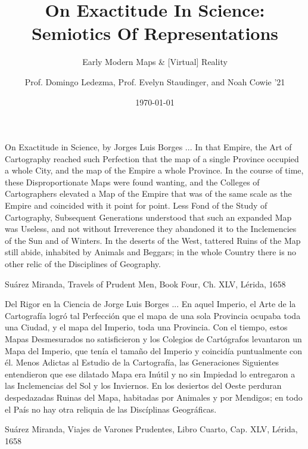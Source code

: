 \documentclass{beamer}
\title{On Exactitude In Science: Semiotics Of Representations}
\subtitle{Early Modern Maps \& [Virtual] Reality}
\author{Prof. Domingo Ledezma, Prof. Evelyn Staudinger, and Noah Cowie '21}
\date{\today}
\begin{document}
\maketitle

\begin{frame}{On Exactitude in Science, by Jorges Luis Borges}
	... In that Empire, the Art of Cartography reached such Perfection that the map of a single
	Province occupied a whole City, and the map of the Empire a whole Province. In the course
	of time, these Disproportionate Maps were found wanting, and the Colleges of Cartographers
	elevated a Map of the Empire that was of the same scale as the Empire and coincided with it
	point for point. Less Fond of the Study of Cartography, Subsequent Generations understood
	that such an expanded Map was Useless, and not without Irreverence they abandoned it to the
	Inclemencies of the Sun and of Winters. In the deserts of the West, tattered Ruins of the Map
	still abide, inhabited by Animals and Beggars; in the whole Country there is no other relic of
	the Disciplines of Geography.\par

	\hfill Su\'arez Miranda, Travels of Prudent Men, Book Four, Ch. XLV, L\'erida, 1658\par
\end{frame}

\begin{frame}{Del Rigor en la Ciencia de Jorge Luis Borges}
	... En aquel Imperio, el Arte de la Cartografía logr\'o tal Perfecci\'on que el mapa de una sola
	Provincia ocupaba toda una Ciudad, y el mapa del Imperio, toda una Provincia. Con el
	tiempo, estos Mapas Desmesurados no satisficieron y los Colegios de Cart\'ografos levantaron
	un Mapa del Imperio, que ten\'ia el tama\~no del Imperio y coincid\'ia puntualmente con \'el.
	Menos Adictas al Estudio de la Cartografía, las Generaciones Siguientes entendieron que ese
	dilatado Mapa era In\'util y no sin Impiedad lo entregaron a las Inclemencias del Sol y los
	Inviernos. En los desiertos del Oeste perduran despedazadas Ruinas del Mapa, habitadas por
	Animales y por Mendigos; en todo el Pa\'is no hay otra reliquia de las Disc\'iplinas Geogr\'aficas.\par

	\hfill Su\'arez Miranda, Viajes de Varones Prudentes, Libro Cuarto, Cap. XLV, L\'erida, 1658\par

\end{frame}
\end{document}
